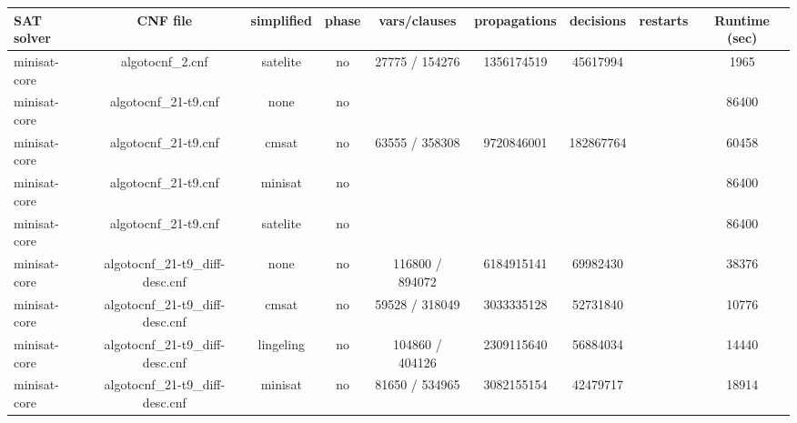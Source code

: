 \begin{appendices}
\begin{table}[p]
  \begin{center}
    \begin{tabular}{l|cccccccc}
        \textbf{SAT solver} & \textbf{CNF file} & \textbf{simplified} & \textbf{phase} & \textbf{vars/clauses} & \textbf{propagations} & \textbf{decisions} & \textbf{restarts} & \textbf{Runtime (sec)} \\
      \hline
  minisat-core                   & algotocnf\_2.cnf               & satelite   & no    & 27775 / 154276 & 1356174519 & 45617994  &            & 1965 \\ %
  minisat-core                   & algotocnf\_21-t9.cnf           & none       & no    &            &           &           &            & 86400 \\ %
  minisat-core                   & algotocnf\_21-t9.cnf           & cmsat      & no    & 63555 / 358308 & 9720846001 & 182867764 &            & 60458 \\ %
  minisat-core                   & algotocnf\_21-t9.cnf           & minisat    & no    &            &           &           &            & 86400 \\ %
  minisat-core                   & algotocnf\_21-t9.cnf           & satelite   & no    &            &           &           &            & 86400 \\ %
  minisat-core                   & algotocnf\_21-t9\_diff-desc.cnf & none       & no    & 116800 / 894072 & 6184915141 & 69982430  &            & 38376 \\ %
  minisat-core                   & algotocnf\_21-t9\_diff-desc.cnf & cmsat      & no    & 59528 / 318049 & 3033335128 & 52731840  &            & 10776 \\ %
  minisat-core                   & algotocnf\_21-t9\_diff-desc.cnf & lingeling  & no    & 104860 / 404126 & 2309115640 & 56884034  &            & 14440 \\ %
  minisat-core                   & algotocnf\_21-t9\_diff-desc.cnf & minisat    & no    & 81650 / 534965 & 3082155154 & 42479717  &            & 18914 \\ %

\end{tabular}
\end{center}
\end{table}
\end{appendices}
